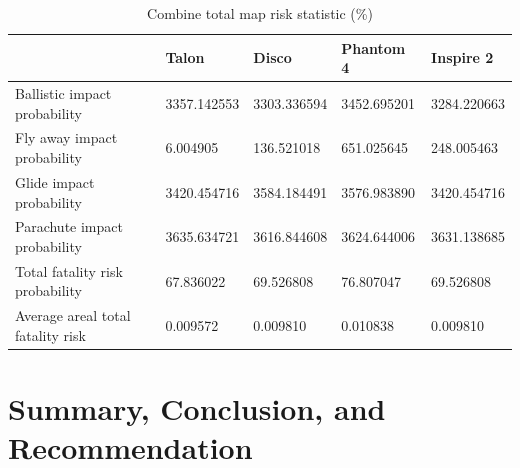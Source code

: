 \documentclass[12pt]{report}
\begin{document}
    \begin{table}[H]
        \centering
        \begin{tabular}{|lllll|}
            \hline
            \textbf{} & \textbf{Talon} & \textbf{Disco} & \textbf{Phantom 4} & \textbf{Inspire 2} \\
            \hline
            {Ballistic impact probability} & 3357.142553 & 3303.336594 & 3452.695201 & 3284.220663 \\
            {Fly away impact probability} & 6.004905 & 136.521018 & 651.025645 & 248.005463 \\
            {Glide impact probability} & 3420.454716 & 3584.184491 & 3576.983890 & 3420.454716 \\
            {Parachute impact probability} & 3635.634721 & 3616.844608 & 3624.644006 & 3631.138685 \\
            {Total fatality risk probability} & 67.836022 & 69.526808 & 76.807047 & 69.526808 \\
            {Average areal total fatality risk} & 0.009572 & 0.009810 & 0.010838 & 0.009810 \\
            \hline
        \end{tabular}
        \captionsetup{justification=justified} %
        \caption{Combine total map risk statistic (\%)} %
        \label{tab:total-map-risk}
    \end{table}


\chapter{Summary, Conclusion, and Recommendation}
\end{document}
